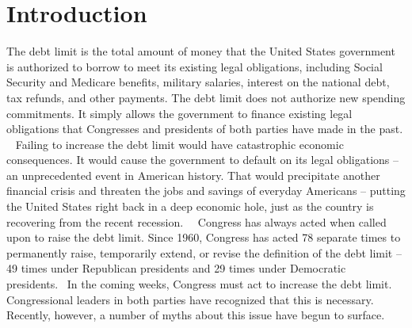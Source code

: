 \section{Introduction}
\label{sec:Introduction}

The debt limit is the total amount of money that the United States government is authorized to borrow to meet its existing legal obligations, including Social Security and Medicare benefits, military salaries, interest on the national debt, tax refunds, and other payments. The debt limit does not authorize new spending commitments. It simply allows the government to finance existing legal obligations that Congresses and presidents of both parties have made in the past.
\newline \newline 
Failing to increase the debt limit would have catastrophic economic consequences. It would cause the government to default on its legal obligations – an unprecedented event in American history. That would precipitate another financial crisis and threaten the jobs and savings of everyday Americans – putting the United States right back in a deep economic hole, just as the country is recovering from the recent recession.  
\newline \newline
Congress has always acted when called upon to raise the debt limit. Since 1960, Congress has acted 78 separate times to permanently raise, temporarily extend, or revise the definition of the debt limit – 49 times under Republican presidents and 29 times under Democratic presidents.  In the coming weeks, Congress must act to increase the debt limit. Congressional leaders in both parties have recognized that this is necessary. Recently, however, a number of myths about this issue have begun to surface.

